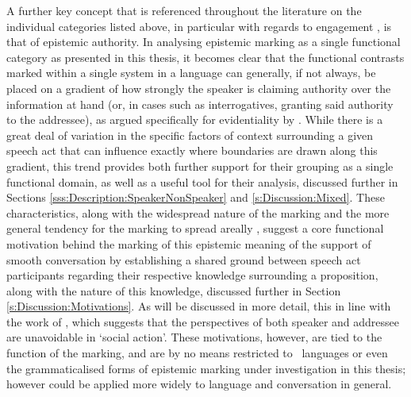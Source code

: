 A further key concept that is referenced throughout the literature on the individual categories listed above, in particular with regards to engagement \cite{EvansBergqvistSanRoque2018a}, is that of epistemic authority. In analysing epistemic marking as a single functional category as presented in this thesis, it becomes clear that the functional contrasts marked within a single system in a language can generally, if not always, be placed on a gradient of how strongly the speaker is claiming authority over the information at hand (or, in cases such as interrogatives, granting said authority to the addressee), as argued specifically for evidentiality by . While there is a great deal of variation in the specific factors of context surrounding a given speech act that can influence exactly where boundaries are drawn along this gradient, this trend provides both further support for their grouping as a single functional domain, as well as a useful tool for their analysis, discussed further in Sections \ref{sss:Description:SpeakerNonSpeaker} and \ref{s:Discussion:Mixed}. These characteristics, along with the widespread nature of the marking and the more general tendency for the marking to spread areally \cite{Aikhenvald2004}, suggest a core functional motivation behind the marking of this epistemic meaning of the support of smooth conversation by establishing a shared ground between speech act participants regarding their respective knowledge surrounding a proposition, along with the nature of this knowledge, discussed further in Section \ref{s:Discussion:Motivations}. As will be discussed in more detail, this in line with the work of , which suggests that the perspectives of both speaker and addressee are unavoidable in `social action'. These motivations, however, are tied to the function of the marking, and are by no means restricted to \lfam\ languages or even the grammaticalised forms of epistemic marking under investigation in this thesis; however could be applied more widely to language and conversation in general.

